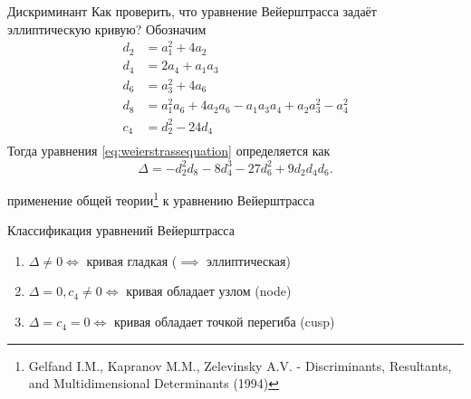 \documentclass{beamer}
\begin{document}
\begin{frame}{Дискриминант}
    Как проверить, что уравнение Вейерштрасса задаёт эллиптическую кривую? Обозначим
    \begin{equation}
        \begin{split}
            d_2 &= a_1^2 + 4a_2 \\
            d_4 &= 2a_4 + a_1a_3 \\
            d_6 &= a_3^2 + 4a_6 \\
            d_8 &= a_1^2a_6 + 4a_2a_6 - a_1a_3a_4 + a_2a_3^2 - a_4^2 \\
            c_4 &= d_2^2 - 24d_4 \\
        \end{split}
    \end{equation}
    Тогда  уравнения \eqref{eq:weierstrassequation} определяется как 
    \[
    \Delta = -d_2^2d_8 - 8d_4^3-27d_6^2+9d_2d_4d_6.
    \]
    
    \ProofBegin
    применение общей теории\footnote{Gelfand I.M., Kapranov M.M., Zelevinsky A.V. - Discriminants, Resultants, and Multidimensional Determinants (1994)} к уравнению Вейерштрасса
    \ProofEnd
\end{frame}


\begin{frame}{Классификация уравнений Вейерштрасса}
    \begin{tcolorbox}[colframe=title-and-section-color!120, colback=title-and-section-color!5, title=Теорема \text{[Silverman, Thm. 1.4]}, center title]
        \begin{enumerate}
            \item $\Delta \neq 0 \iff$ кривая гладкая ($\implies$ эллиптическая) 
            \item $\Delta = 0, c_4 \neq 0 \iff$ кривая обладает узлом (node) 
            \item $\Delta = c_4 = 0 \iff$ кривая обладает точкой перегиба (cusp)
        \end{enumerate}
    \end{tcolorbox}
\end{frame}
\end{document}
